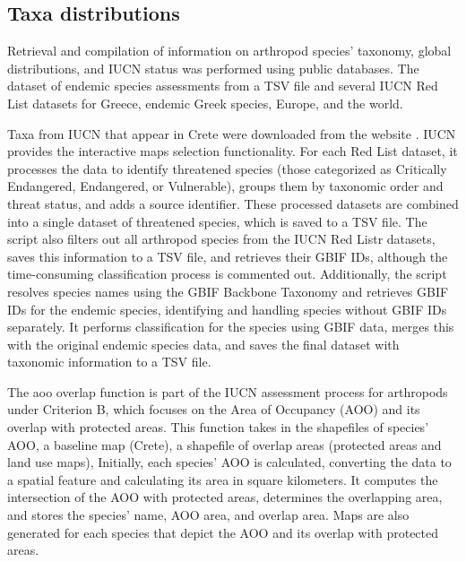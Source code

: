     \subsection{Taxa distributions}
    \label{subsec:arthropods-eoo-aoo}
Retrieval and compilation of information on arthropod species' taxonomy,
global distributions, and IUCN status was performed using public databases.
The dataset of endemic species assessments from a TSV file and several IUCN Red
List datasets for Greece, endemic Greek species, Europe, and the world.

Taxa from IUCN that appear in Crete were downloaded from the website \parencite{iucn2024}. IUCN provides the 
interactive maps selection functionality. 
For each Red List dataset, it processes the data to identify threatened species
(those categorized as Critically Endangered, Endangered, or Vulnerable), groups
them by taxonomic order and threat status, and adds a source identifier.
These processed datasets are combined into a single dataset of threatened species, which is saved to a TSV file.
The script also filters out all arthropod species from the IUCN Red Listr
datasets, saves this information to a TSV file, and retrieves their GBIF IDs,
although the time-consuming classification process is commented out.
Additionally, the script resolves species names using the GBIF Backbone Taxonomy
and retrieves GBIF IDs for the endemic species, identifying and handling species
without GBIF IDs separately. It performs classification for the species using
GBIF data, merges this with the original endemic species data, and saves the
final dataset with taxonomic information to a TSV file.

The aoo overlap function is part of the IUCN assessment process for arthropods
under Criterion B, which focuses on the Area of Occupancy (AOO) and its overlap
with protected areas. This function takes in the shapefiles of species' AOO,
a baseline map (Crete), a shapefile of overlap areas (protected areas and land use maps),
Initially, each species' AOO is calculated, converting the data to a spatial feature
and calculating its area in square kilometers. It computes the intersection of
the AOO with protected areas, determines the overlapping area, and stores the
species' name, AOO area, and overlap area. Maps are also generated for each
species that depict the AOO and its overlap with protected areas.

